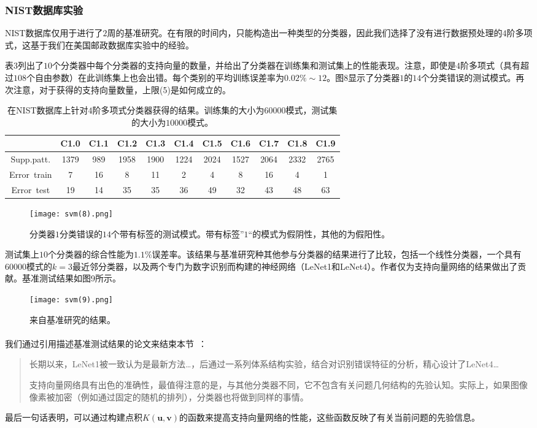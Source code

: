 \documentclass[lang=cn,11pt,a4paper]{elegantpaper}
\newcommand{\upcite}[1]{\textsuperscript{\textsuperscript{\cite{#1}}}}
\begin{document}
	\subsubsection{NIST数据库实验}
	NIST数据库仅用于进行了$2$周的基准研究。在有限的时间内，只能构造出一种类型的分类器，因此我们选择了没有进行数据预处理的$4$阶多项式，这基于我们在美国邮政数据库实验中的经验。

	表3列出了$10$个分类器中每个分类器的支持向量的数量，并给出了分类器在训练集和测试集上的性能表现。注意，即使是$4$阶多项式（具有超过$108$个自由参数）在此训练集上也会出错。每个类别的平均训练误差率为$0.02\%\sim12$。图8显示了分类器$1$的$14$个分类错误的测试模式。再次注意，对于获得的支持向量数量，上限(5)是如何成立的。

	\begin{table}[!htbp]
		\centering
		\caption{在NIST数据库上针对$4$阶多项式分类器获得的结果。训练集的大小为$60000$模式，测试集的大小为$10000$模式。}
		\begin{tabular}{ccccccccccc}
			\hline
			{} & {C1.0} & {C1.1} & {C1.2} & {C1.3} & {C1.4} & {C1.5} & {C1.6} & {C1.7} & {C1.8} &{C1.9} \\
			\hline
			{Supp.patt.} & 1379 & 989 & 1958 & 1900 & 1224 & 2024 & 1527 & 2064 & 2332 & 2765 \\
			{Error\ train} & 7 & 16 & 8 & 11 & 2 & 4 & 8 & 16 & 4 & 1 \\
			{Error\ test} & 19 & 14 & 35 & 35 & 36 & 49 & 32 & 43 & 48 & 63 \\
    		\hline
		\end{tabular}
	\end{table}
	\begin{figure}[htbp]
		\centering
		\texttt{[image: svm(8).png]}
		\caption{分类器$1$分类错误的$14$个带有标签的测试模式。带有标签”$1$“的模式为假阴性，其他的为假阳性。}
	\end{figure}
	测试集上$10$个分类器的综合性能为$1.1\%$误差率。该结果与基准研究种其他参与分类器的结果进行了比较，包括一个线性分类器，一个具有$60000$模式的$k=3$最近邻分类器，以及两个专门为数字识别而构建的神经网络（LeNet1和LeNet4）。作者仅为支持向量网络的结果做出了贡献。基准测试结果如图9所示。
	\begin{figure}[htbp]
		\centering
		\texttt{[image: svm(9).png]}
		\caption{来自基准研究的结果。}
	\end{figure}
	我们通过引用描述基准测试结果的论文来结束本节~\upcite{bottou1994comparison}：
	\begin{quote}
		长期以来，LeNet1被一致认为是最新方法…，后通过一系列体系结构实验，结合对识别错误特征的分析，精心设计了LeNet4…

		支持向量网络具有出色的准确性，最值得注意的是，与其他分类器不同，它不包含有关问题几何结构的先验认知。实际上，如果图像像素被加密（例如通过固定的随机的排列），分类器也将做到同样的事情。
	\end{quote}
	最后一句话表明，可以通过构建点积$K(\mathbf{u},\mathbf{v})$的函数来提高支持向量网络的性能，这些函数反映了有关当前问题的先验信息。
\end{document}
